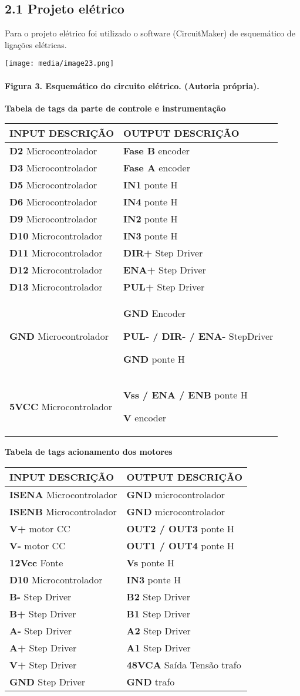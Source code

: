 \documentclass[]{article}
\let\oldparagraph\paragraph
\renewcommand{\paragraph}[1]{\oldparagraph{#1}\mbox{}}
\begin{document}
\subsection{2.1 Projeto elétrico}\label{projeto-eluxe9trico}

Para o projeto elétrico foi utilizado o software (CircuitMaker) de
esquemático de ligações elétricas.

\texttt{[image: media/image23.png]}

\paragraph{Figura 3. Esquemático do circuito elétrico. (Autoria
própria).}\label{figura-3.-esquemuxe1tico-do-circuito-eluxe9trico.-autoria-pruxf3pria.}

\textbf{Tabela de tags da parte de controle e instrumentação}

\begin{longtable}[]{@{}ll@{}}
\toprule
INPUT DESCRIÇÃO & OUTPUT DESCRIÇÃO\tabularnewline
\midrule
\endhead
\textbf{D2} Microcontrolador & \textbf{Fase B} encoder\tabularnewline
\textbf{D3} Microcontrolador & \textbf{Fase A} encoder\tabularnewline
\textbf{D5} Microcontrolador & \textbf{IN1} ponte H\tabularnewline
\textbf{D6} Microcontrolador & \textbf{IN4} ponte H\tabularnewline
\textbf{D9} Microcontrolador & \textbf{IN2} ponte H\tabularnewline
\textbf{D10} Microcontrolador & \textbf{IN3} ponte H\tabularnewline
\textbf{D11} Microcontrolador & \textbf{DIR+} Step Driver\tabularnewline
\textbf{D12} Microcontrolador & \textbf{ENA+} Step Driver\tabularnewline
\textbf{D13} Microcontrolador & \textbf{PUL+} Step Driver\tabularnewline
\textbf{GND} Microcontrolador & \textbf{GND} Encoder

\textbf{PUL- / DIR- / ENA-} StepDriver

\textbf{GND} ponte H\tabularnewline
\textbf{5VCC} Microcontrolador & \textbf{Vss / ENA / ENB} ponte H

\textbf{V} encoder\tabularnewline
\bottomrule
\end{longtable}

\textbf{Tabela de tags acionamento dos motores}

\begin{longtable}[]{@{}ll@{}}
\toprule
INPUT DESCRIÇÃO & OUTPUT DESCRIÇÃO\tabularnewline
\midrule
\endhead
\textbf{ISENA} Microcontrolador & \textbf{GND}
microcontrolador\tabularnewline
\textbf{ISENB} Microcontrolador & \textbf{GND}
microcontrolador\tabularnewline
\textbf{V+} motor CC & \textbf{OUT2 / OUT3} ponte H\tabularnewline
\textbf{V-} motor CC & \textbf{OUT1 / OUT4} ponte H\tabularnewline
\textbf{12Vcc} Fonte & \textbf{Vs} ponte H\tabularnewline
\textbf{D10} Microcontrolador & \textbf{IN3} ponte H\tabularnewline
\textbf{B-} Step Driver & \textbf{B2} Step Driver\tabularnewline
\textbf{B+} Step Driver & \textbf{B1} Step Driver\tabularnewline
\textbf{A-} Step Driver & \textbf{A2} Step Driver\tabularnewline
\textbf{A+} Step Driver & \textbf{A1} Step Driver\tabularnewline
\textbf{V+} Step Driver & \textbf{48VCA} Saída Tensão
trafo\tabularnewline
\textbf{GND} Step Driver & \textbf{GND} trafo\tabularnewline
\bottomrule
\end{longtable}
\end{document}
